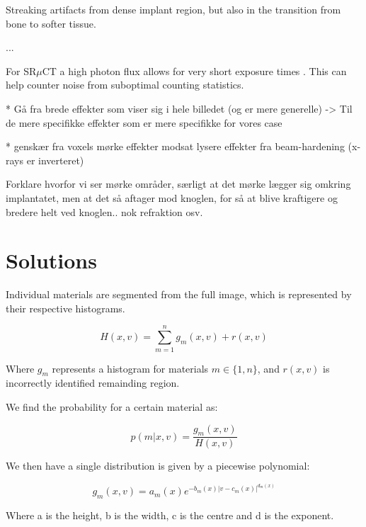 Streaking artifacts from dense implant region, but also in the transition from bone to softer tissue.

...

For SR$\mu$CT a high photon flux allows for very short exposure times \citep{srexptime}.
This can help counter noise from suboptimal counting statistics\citep{srnoise}.


* Gå fra brede effekter som viser sig i hele billedet (og er mere generelle) -> Til de mere specifikke effekter som er mere specifikke for vores case

* genskær fra voxels
mørke effekter modsat lysere effekter fra beam-hardening (x-rays er inverteret)

Forklare hvorfor vi ser mørke områder, særligt at det mørke lægger sig omkring implantatet,
men at det så aftager mod knoglen, for så at blive kraftigere og bredere helt ved knoglen..
nok refraktion osv. 


\section*{Solutions}


Individual materials are segmented from the full image, which is represented by their respective histograms.

\begin{equation}
H(x,v) = \sum_{m=1}^{n} g_{m}(x,v) + r(x,v)
\end{equation}

Where $g_m$ represents a histogram for materials $m\in\{1,n\}$, and $r(x,v)$ is incorrectly identified remainding region.

We find the probability for a certain material as:

\begin{equation}
p(m|x,v) = \frac{g_{m}(x,v)}{H(x,v)}
\end{equation}

We then have a single distribution is given by a piecewise polynomial:

\begin{equation}
g_{m}(x,v) = a_{m}(x) e^{ -b_{m}(x) |v-c_{m}(x)|^{d_{m}(x)} }
\end{equation}

Where a is the height, b is the width, c is the centre and d is the exponent.

